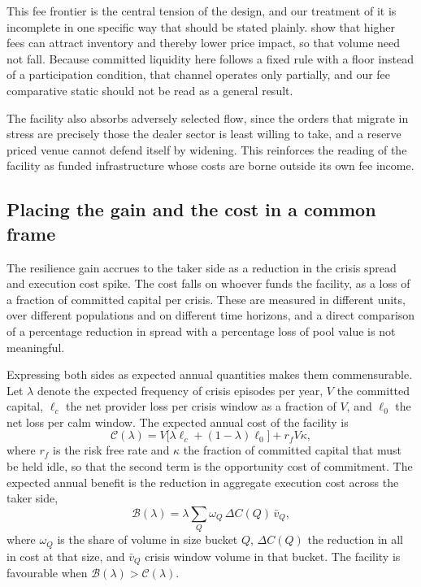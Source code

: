 \documentclass[a4paper,fleqn]{cas-sc}
\begin{document}
This fee frontier is the central tension of the design, and our treatment of it is incomplete in one specific way that should be stated plainly. \citet{hasbrouck2024dex} show that higher fees can attract inventory and thereby lower price impact, so that volume need not fall. Because committed liquidity here follows a fixed rule with a floor instead of a participation condition, that channel operates only partially, and our fee comparative static should not be read as a general result.

The facility also absorbs adversely selected flow, since the orders that migrate in stress are precisely those the dealer sector is least willing to take, and a reserve priced venue cannot defend itself by widening. This reinforces the reading of the facility as funded infrastructure whose costs are borne outside its own fee income.

\subsection{Placing the gain and the cost in a common frame}

The resilience gain accrues to the taker side as a reduction in the crisis spread and execution cost spike. The cost falls on whoever funds the facility, as a loss of a fraction of committed capital per crisis. These are measured in different units, over different populations and on different time horizons, and a direct comparison of a percentage reduction in spread with a percentage loss of pool value is not meaningful.

Expressing both sides as expected annual quantities makes them commensurable. Let \(\lambda\) denote the expected frequency of crisis episodes per year, \(V\) the committed capital, \(\ell_c\) the net provider loss per crisis window as a fraction of \(V\), and \(\ell_0\) the net loss per calm window. The expected annual cost of the facility is
\begin{equation}
\mathcal{C}(\lambda)=V\Big[\lambda \ell_c + (1-\lambda)\ell_0\Big] + r_f V \kappa,
\end{equation}
where \(r_f\) is the risk free rate and \(\kappa\) the fraction of committed capital that must be held idle, so that the second term is the opportunity cost of commitment. The expected annual benefit is the reduction in aggregate execution cost across the taker side,
\begin{equation}
\mathcal{B}(\lambda)=\lambda \sum_{Q} \omega_Q\, \Delta C(Q)\, \bar{v}_Q,
\end{equation}
where \(\omega_Q\) is the share of volume in size bucket \(Q\), \(\Delta C(Q)\) the reduction in all in cost at that size, and \(\bar{v}_Q\) crisis window volume in that bucket. The facility is favourable when \(\mathcal{B}(\lambda)>\mathcal{C}(\lambda)\).
\end{document}
